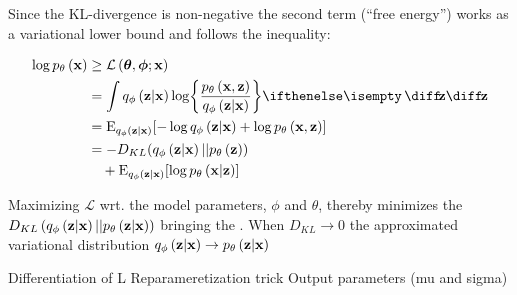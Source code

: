 Since the KL-divergence is non-negative the second term (``free energy'') works as a variational lower bound and follows the inequality:

\begin{gather}
	\begin{split}
		\log \dec{\vec{x}} & \ge \mathcal{L}\left(\vec{\theta},\vec{\phi};\vec{x}\right)
		\\ & =
		\int \enc{\vec{z}|\vec{x}} \log \curlies*{ \frac{\dec{\vec{x},\vec{z}}}{\enc{\vec{z}|\vec{x}} } } \D{\vec{z}} \\ 
		& = \E_{\enc{\vec{z}|\vec{x}}} \brackets{- \log \enc{\vec{z}|\vec{x}} + \log \dec{\vec{x},\vec{z}} } 
		\\
		& = -D_{KL}\parens{ \enc{\vec{z}|\vec{x}}||\dec{\vec{z}} } 
		\\ 
		& \quad+ \E_{\enc{\vec{z}|\vec{x}}} \brackets{\log \dec{\vec{x}|\vec{z}} }   	
	\end{split} 
\end{gather}

Maximizing $\mathcal{L}$ wrt. the model parameters, $\phi$ and $\theta$, thereby minimizes the $D_{KL}\left( q_{\phi}\left(\bm{\mathrm{z}}|\bm{\mathrm{x}}\right)||p_{\theta}\left(\bm{\mathrm{z}}|\bm{\mathrm{x}}\right)\right)$ bringing the . When $D_{KL}\rightarrow 0$ the approximated variational distribution $q_{\phi}\left(\bm{\mathrm{z}}|\bm{\mathrm{x}}\right)\rightarrow p_{\theta}\left(\bm{\mathrm{z}}|\bm{\mathrm{x}}\right)$

Differentiation of L
Reparameretization trick
Output parameters (mu and sigma)



